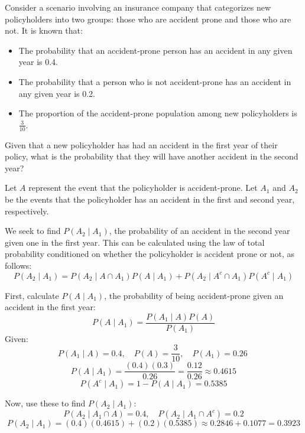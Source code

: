 \begin{example}
    Consider a scenario involving an insurance company that categorizes new policyholders into two groups: those who are accident prone and those who are not. It is known that:
\begin{itemize}
    \item The probability that an accident-prone person has an accident in any given year is 0.4.
    \item The probability that a person who is not accident-prone has an accident in any given year is 0.2.
    \item The proportion of the accident-prone population among new policyholders is \( \frac{3}{10} \).
\end{itemize}
Given that a new policyholder has had an accident in the first year of their policy, what is the probability that they will have another accident in the second year?
\begin{solution}
    Let \( A \) represent the event that the policyholder is accident-prone. Let \( A_1 \) and \( A_2 \) be the events that the policyholder has an accident in the first and second year, respectively.

We seek to find \( P(A_2 \mid A_1) \), the probability of an accident in the second year given one in the first year. This can be calculated using the law of total probability conditioned on whether the policyholder is accident prone or not, as follows:
\[
P(A_2 \mid A_1) = P(A_2 \mid A \cap A_1)P(A \mid A_1) + P(A_2 \mid  A^c\cap A_1)P(A^c \mid A_1)
\]

First, calculate \( P(A \mid A_1) \), the probability of being accident-prone given an accident in the first year:
\[
P(A \mid A_1) = \frac{P(A_1 \mid A)P(A)}{P(A_1)}
\]
Given:
\[
P(A_1 \mid A) = 0.4, \quad P(A) = \frac{3}{10}, \quad P(A_1) = 0.26 \
\]
\[
P(A \mid A_1) = \frac{(0.4)(0.3)}{0.26} = \frac{0.12}{0.26} \approx 0.4615
\]
\[
P(A^c \mid A_1) = 1 - P(A \mid A_1) = 0.5385
\]

Now, use these to find \( P(A_2 \mid A_1) \):
\[
P(A_2 \mid A_1 \cap A) = 0.4, \quad P(A_2 \mid A_1 \cap A^c) = 0.2
\]
\[
P(A_2 \mid A_1) = (0.4)(0.4615) + (0.2)(0.5385) \approx 0.2846 + 0.1077 = 0.3923
\]

\end{solution}
\end{example}
